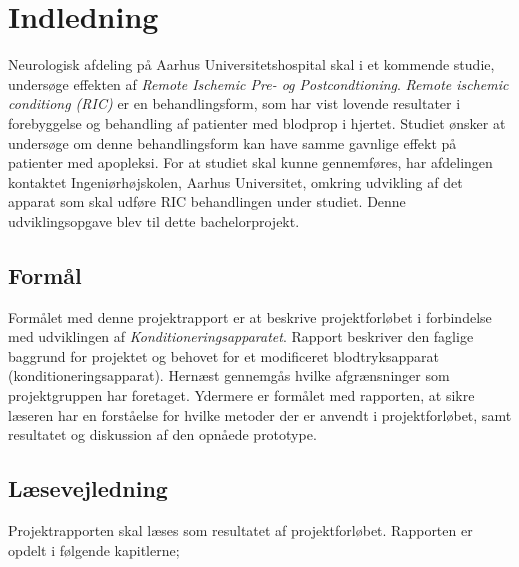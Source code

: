 \chapter{Indledning}
Neurologisk afdeling på Aarhus Universitetshospital skal i et kommende studie, undersøge effekten af \textit{Remote Ischemic Pre- og Postcondtioning}. \textit{Remote ischemic conditiong (RIC)} er en behandlingsform, som har vist lovende resultater i forebyggelse og behandling af patienter med blodprop i hjertet. Studiet ønsker at undersøge om denne behandlingsform kan have samme gavnlige effekt på patienter med apopleksi. For at studiet skal kunne gennemføres, har afdelingen kontaktet Ingeniørhøjskolen, Aarhus Universitet, omkring udvikling af det apparat som skal udføre RIC behandlingen under studiet. Denne udviklingsopgave blev til dette bachelorprojekt. 

\section{Formål}
Formålet med denne projektrapport er at beskrive projektforløbet i forbindelse med udviklingen af \textit{Konditioneringsapparatet}. Rapport beskriver den faglige baggrund for projektet og behovet for et modificeret blodtryksapparat (konditioneringsapparat). Hernæst gennemgås hvilke afgrænsninger som projektgruppen har foretaget. Ydermere er formålet med rapporten, at sikre læseren har en forståelse for hvilke metoder der er anvendt i projektforløbet, samt resultatet og diskussion af den opnåede prototype. 

\section{Læsevejledning}
Projektrapporten skal læses som resultatet af projektforløbet. Rapporten er opdelt i følgende kapitlerne;

